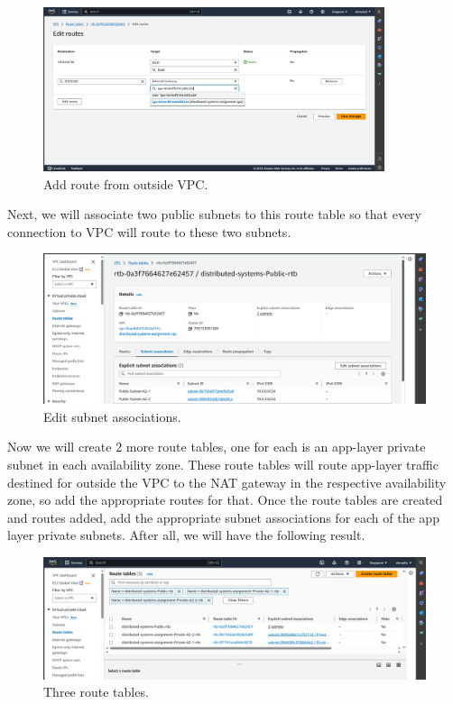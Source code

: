 \documentclass{article}
\begin{document}
\begin{figure}[h]
    \centering
    \includegraphics[width=10cm]{Pictures/Networking and Security/Edit_route_public.png}
    \caption{Add route from outside VPC.}
    \label{fig:enter-label}
\end{figure}

\newpage
Next, we will associate two public subnets to this route table so that every connection to VPC will route to these two subnets.

\begin{figure}[!htp]
    \centering
    \includegraphics[width=12cm]{Pictures/Networking and Security/Public_rtb_Sub_Asso.png}
    \caption{Edit subnet associations.}
    \label{fig:enter-label}
\end{figure}

Now we will create 2 more route tables, one for each is an app-layer private subnet in each availability zone. These route tables will route app-layer traffic destined for outside the VPC to the NAT gateway in the respective availability zone, so add the appropriate routes for that. Once the route tables are created and routes added, add the appropriate subnet associations for each of the app layer private subnets. After all, we will have the following result.\par
\begin{figure}[h]
    \centering
    \includegraphics[width=12cm]{Pictures/Networking and Security/route_table_create_all.png}
    \caption{Three route tables.}
    \label{fig:enter-label}
\end{figure}
\end{document}
